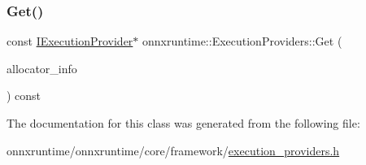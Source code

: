\subsubsection{\texorpdfstring{Get()}{Get()}\hspace{0.1cm}{\footnotesize\ttfamily [4/4]}}
{\footnotesize\ttfamily const \mbox{\hyperlink{classonnxruntime_1_1IExecutionProvider}{I\+Execution\+Provider}}$\ast$ onnxruntime\+::\+Execution\+Providers\+::\+Get (\begin{DoxyParamCaption}\item[{const \mbox{\hyperlink{structONNXRuntimeAllocatorInfo}{O\+N\+N\+X\+Runtime\+Allocator\+Info}} \&}]{allocator\+\_\+info }\end{DoxyParamCaption}) const\hspace{0.3cm}{\ttfamily [inline]}}



The documentation for this class was generated from the following file\+:\begin{DoxyCompactItemize}
\item 
onnxruntime/onnxruntime/core/framework/\mbox{\hyperlink{execution__providers_8h}{execution\+\_\+providers.\+h}}\end{DoxyCompactItemize}
